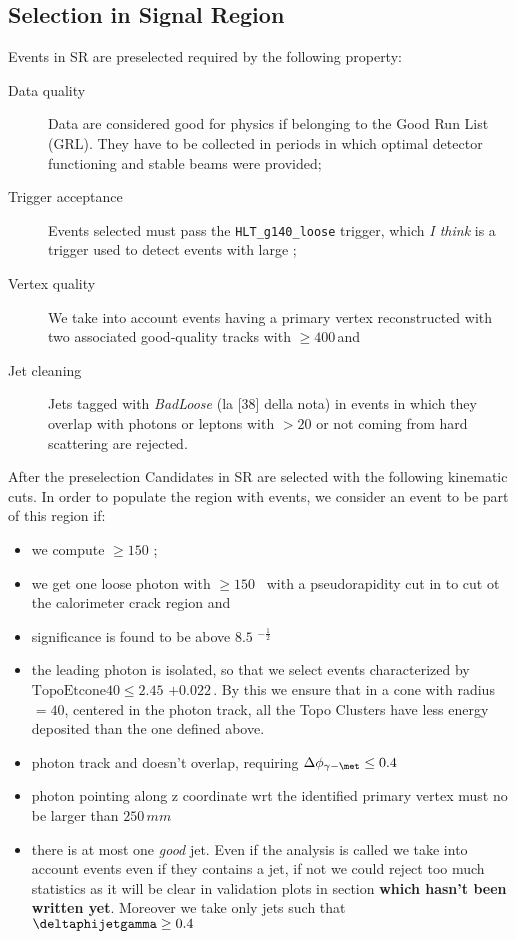 \subsection{Selection in Signal Region}
Events in SR are preselected required by the following property:
\begin{description}%
\item [Data quality] Data are considered good for physics if belonging to the Good Run List (GRL). They have to be collected in periods in which optimal detector functioning and stable beams were provided;
\item [Trigger acceptance] Events selected must pass the  \verb!HLT_g140_loose! trigger, which {\itshape I think} is a trigger used to detect events with large \met; 
\item [Vertex quality] We take into account events having a primary vertex reconstructed with two associated good-quality tracks with \pt $\ge 400 \,$\MeV and 
\item [Jet cleaning] Jets tagged with {\itshape BadLoose} (la [38] della nota) in events in which they overlap with photons or leptons with \pt$> 20$ \GeV or not coming from hard scattering are rejected.
\end{description}

After the preselection Candidates in SR are selected with the following kinematic cuts. In order to populate the region with \gmet events, we consider an event to be part of this region if:
\begin{itemize}
\item we compute \met $ \ge 150 $ \GeV;
\item we get one loose photon with \pt $ \ge 150 $ \GeV $\,$ with a pseudorapidity cut in  to cut ot the calorimeter crack region and 
\item \met significance is found to be above $8.5$ \GeV$^{-\frac{1}{2}}$
\item the leading photon is isolated, so that we select events characterized by $ \text{TopoEtcone40} \le 2.45$ \GeV$ + 0.022 \, $\pt \GeV. By this we ensure that in a cone with radius \DeltaRdef $ = 40$, centered in the photon track, all the Topo Clusters have less energy deposited than the one defined above.
\item photon track and \met doesn't overlap, requiring $\Delta\phi_{\gamma - \met} \le 0.4$
\item photon pointing along z coordinate wrt the identified primary vertex must no be larger than $250 \, mm$
\item there is at most one {\itshape good} jet. Even if the analysis is called \mph we take into account events even if they contains a jet, if not we could reject too much statistics as it will be clear in validation plots in section {\bfseries which hasn't been written yet}. Moreover we take only jets such that $\deltaphijetgamma \ge 0.4$

\end{itemize}

